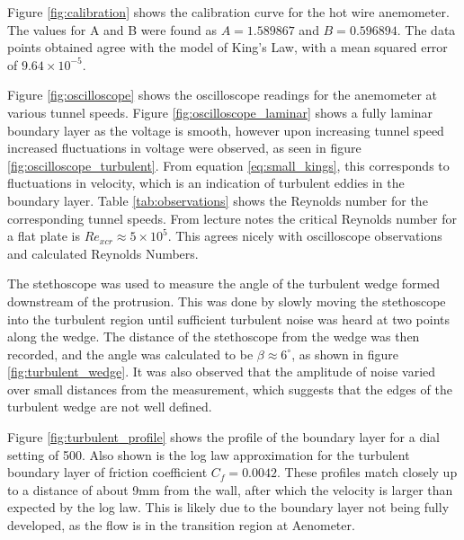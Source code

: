 \documentclass{article}
\begin{document}

Figure \ref{fig:calibration} shows the calibration curve for the hot wire anemometer.
The values for A and B were found as $A	= 1.589867$ and $B	= 0.596894$.
The data points obtained agree with the model of King's Law, with a mean squared error of $9.64\times 10^{-5}$.


Figure \ref{fig:oscilloscope} shows the oscilloscope readings for the anemometer at various tunnel speeds.
Figure \ref{fig:oscilloscope_laminar} shows a fully laminar boundary layer as the voltage is smooth, 
however upon increasing tunnel speed increased fluctuations in voltage were observed, as seen in figure \ref{fig:oscilloscope_turbulent}.
From equation \ref{eq:small_kings}, this corresponds to fluctuations in velocity, which is an indication of turbulent eddies in the boundary layer.
Table \ref{tab:observations} shows the Reynolds number for the corresponding tunnel speeds.
From lecture notes the critical Reynolds number for a flat plate is $Re_{xcr} \approx 5 \times 10^5$.
This agrees nicely with oscilloscope observations and calculated Reynolds Numbers.


The stethoscope was used to measure the angle of the turbulent wedge formed downstream of the protrusion.
This was done by slowly moving the stethoscope into the turbulent region until sufficient turbulent noise was heard at two points along the wedge.
The distance of the stethoscope from the wedge was then recorded, and the angle was calculated to be $\beta \approx 6^\circ$, as shown in figure \ref{fig:turbulent_wedge}.
It was also observed that the amplitude of noise varied over small distances from the measurement, which suggests that the edges of the turbulent wedge
are not well defined.


Figure \ref{fig:turbulent_profile} shows the profile of the boundary layer for a dial setting of 500.
Also shown is the log law approximation for the turbulent boundary layer of friction coefficient $C_f = 0.0042$.
These profiles match closely up to a distance of about 9mm from the wall, after which the velocity is larger than expected by the log law.
This is likely due to the boundary layer not being fully developed, as the flow is in the transition region at Aenometer.
\end{document}
